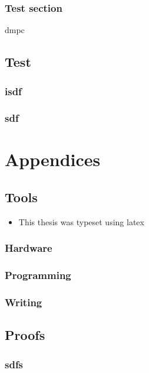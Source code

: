 \documentclass{these-dbl}
\begin{document}
\section{Test section}

\gls{dmpc}

\cite{YangEtAl2022}
\printbibliography%


\chapter{Test}
\minitoc
\section{isdf}

\section{sdf}

\cite{AlessioBemporad2009}
\cite{YangEtAl2022}
\printbibliography%


\appendix
\part{Appendices}
\chapter{Tools}
\minitoc
\begin{itemize}
  \item This thesis was typeset using \gls{latex}

\end{itemize}

\section{Hardware}
\section{Programming}
\section{Writing}
\section{}
\chapter{Proofs}
\minitoc
\section{sdfs}





\makebackcover
\end{document}
